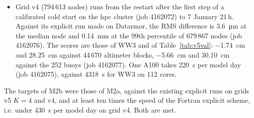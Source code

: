 \documentclass[11pt,a4paper]{article}
\begin{document}
\begin{itemize}
and \SI{32.46}{cm} against the 252 buoys (job 4162040). One A100 takes
\SI{124}{s} per model day (job 4162038), against \SI{2601}{s} for WW3 on
112 Datarmor cores.
\item Grid v4 (794\,613 nodes) runs from the restart after the first step
of a calibrated cold start on the hpc cluster (job 4162072) to 7 January
21\,h. Against its explicit run made on Datarmor, the RMS difference is
\SI{3.6}{\micro\metre} at the median node and \SI{0.14}{mm} at the 99th
percentile of 679\,867 nodes (job 4162076). The scores are those of WW3
and of Table~\ref{tab:v5val}: \SI{-1.74}{cm} and \SI{28.25}{cm} against
44\,670 altimeter blocks, \SI{-5.66}{cm} and \SI{30.10}{cm} against the
252 buoys (job 4162077). One A100 takes \SI{220}{s} per model day
(job 4162075), against \SI{4318}{s} for WW3 on 112 cores.
\end{itemize}
The targets of M2b were those of M2a, against the existing explicit runs on
grids v5 $K=4$ and v4, and at least ten times the speed of the Fortran
explicit scheme, i.e. under \SI{430}{s} per model day on grid v4. Both
are met.
\end{document}
